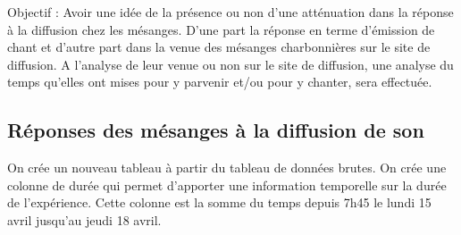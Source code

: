 \documentclass[
  french,
]{article}
\begin{document}
Objectif : Avoir une idée de la présence ou non d'une atténuation dans
la réponse à la diffusion chez les mésanges. D'une part la réponse en
terme d'émission de chant et d'autre part dans la venue des mésanges
charbonnières sur le site de diffusion. A l'analyse de leur venue ou non
sur le site de diffusion, une analyse du temps qu'elles ont mises pour y
parvenir et/ou pour y chanter, sera effectuée.

\subsection{Réponses des mésanges à la diffusion de
son}\label{ruxe9ponses-des-muxe9sanges-uxe0-la-diffusion-de-son}

On crée un nouveau tableau à partir du tableau de données brutes. On
crée une colonne de durée qui permet d'apporter une information
temporelle sur la durée de l'expérience. Cette colonne est la somme du
temps depuis 7h45 le lundi 15 avril jusqu'au jeudi 18 avril.
\end{document}
